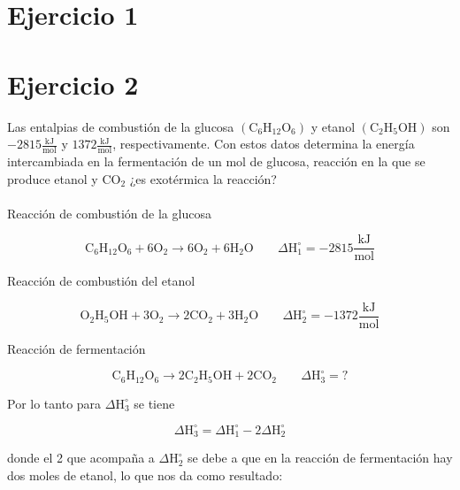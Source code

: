 \documentclass[12pt]{article}
\begin{document}
\section*{Ejercicio 1}

\section*{Ejercicio 2}
Las entalpias de combustión de la glucosa $(\mathrm{C}_6\mathrm{H}_{12}\mathrm{O}_6)$ y etanol $(\mathrm{C}_2\mathrm{H}_5\mathrm{OH})$ son $-2815\frac{\mathrm{kJ}}{\mathrm{mol}}$ y $1372 \frac{\mathrm{kJ}}{\mathrm{mol}}$, respectivamente. Con estos datos determina la energía intercambiada en la fermentación de un mol de glucosa, reacción en la que se produce etanol y $\mathrm{CO}_2$ ¿es exotérmica la reacción?\\
\\
Reacción de combustión de la glucosa

\begin{displaymath}
	\mathrm{C}_6\mathrm{H}_{12}\mathrm{O}_6+6\mathrm{O}_2 \rightarrow 6\mathrm{O}_2+6\mathrm{H}_2\mathrm{O} \;\;\;\;\;\;\; \Delta\mathrm{H}_1^{\circ}=-2815\frac{\mathrm{kJ}}{\mathrm{mol}}
\end{displaymath}

Reacción de combustión del etanol

\begin{displaymath}
	\mathrm{O}_2\mathrm{H}_5\mathrm{OH}+3\mathrm{O}_2 \rightarrow 2\mathrm{CO}_2+3\mathrm{H}_2\mathrm{O}\;\;\;\;\;\;\; \Delta\mathrm{H}_2^{\circ}=-1372\frac{\mathrm{kJ}}{\mathrm{mol}}
\end{displaymath}

Reacción de fermentación

\begin{displaymath}
		\mathrm{C}_6\mathrm{H}_{12}\mathrm{O}_6 \rightarrow 2\mathrm{C}_2\mathrm{H}_5\mathrm{OH} + 2\mathrm{CO}_2 \;\;\;\;\;\;\; \Delta\mathrm{H}_3^{\circ}= ?
\end{displaymath}

Por lo tanto para $\Delta\mathrm{H}_3^{\circ}$ se tiene

\begin{displaymath}
	\Delta\mathrm{H}_3^{\circ}=\Delta\mathrm{H}_1^{\circ}-2\Delta\mathrm{H}_2^{\circ}
\end{displaymath}

donde el 2 que acompaña a $\Delta\mathrm{H}_2^{\circ}$ se debe a que en la reacción de fermentación hay dos moles de etanol, lo que nos da como resultado:
\end{document}

